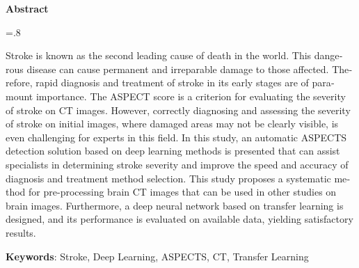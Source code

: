 


\pagestyle{empty}

\begin{latin}

\begin{center}
\textbf{Abstract}
\end{center}
\baselineskip=.8\baselineskip

Stroke is known as the second leading cause of death in the world.
This dangerous disease can cause permanent and irreparable damage to those affected.
Therefore, rapid diagnosis and treatment of stroke in its early stages are of paramount importance.
The ASPECT score is a criterion for evaluating the severity of stroke on CT images.
However, correctly diagnosing and assessing the severity of stroke on initial images, where damaged areas may not be clearly visible, is even challenging for experts in this field.
In this study, an automatic ASPECTS detection solution based on deep learning methods is presented that can assist specialists in determining stroke severity and improve the speed and accuracy of diagnosis and treatment method selection.
This study proposes a systematic method for pre-processing brain CT images that can be used in other studies on brain images. Furthermore, a deep neural network based on transfer learning is designed, and its performance is evaluated on available data, yielding satisfactory results.


\bigskip\noindent\textbf{Keywords}:
Stroke, Deep Learning, ASPECTS, CT, Transfer Learning

\end{latin}
